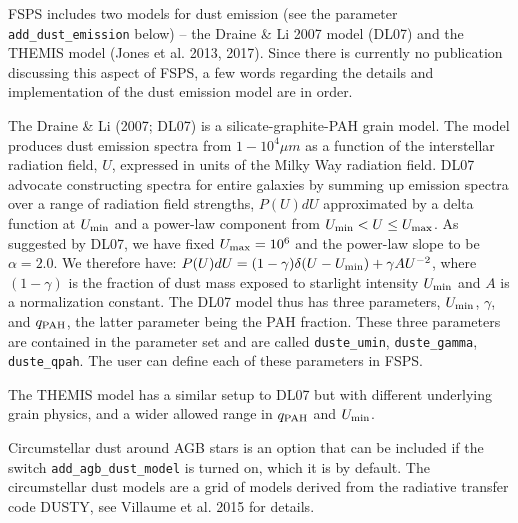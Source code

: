 \documentclass[]{article}
\begin{document}
\vspace{0.1in}
\vspace{0.1in}

\noindent
FSPS includes two models for dust emission (see the parameter
\texttt{add\_dust\_emission} below) -- the Draine \& Li 2007 model (DL07) and
the THEMIS model (Jones et al. 2013, 2017).  Since there is currently no
publication discussing this aspect of FSPS, a few words regarding the details
and implementation of the dust emission model are in order.

The Draine \& Li (2007; DL07) is a silicate-graphite-PAH grain model. The model
produces dust emission spectra from $1-10^4\mu m$ as a function of the
interstellar radiation field, $U$, expressed in units of the Milky Way radiation
field.  DL07 advocate constructing spectra for entire galaxies by summing up
emission spectra over a range of radiation field strengths, $P(U)dU$
approximated by a delta function at $U_{\rm min}$ and a power-law component from
$U_{\rm min}<U\leq U_{\rm max}$.  As suggested by DL07, we have fixed $U_{\rm
max}=10^6$ and the power-law slope to be $\alpha=2.0$.  We therefore have:
$P(U)dU=(1-\gamma)\delta(U-U_{\rm min})+\gamma A U^{-2}$,
where $(1-\gamma)$ is the fraction of dust mass exposed to starlight intensity
$U_{\rm min}$ and $A$ is a normalization constant.  The DL07 model thus has
three parameters, $U_{\rm min}$, $\gamma$, and $q_{\rm PAH}$, the latter
parameter being the PAH fraction.  These three parameters are contained in the
parameter set and are called \texttt{duste\_umin}, \texttt{duste\_gamma},
\texttt{duste\_qpah}. The user can define each of these parameters in FSPS.

The THEMIS model has a similar setup to DL07 but with different underlying grain
physics, and a wider allowed range in $q_{\rm PAH}$ and $U_{\rm min}$.

\vspace{0.1in}
\vspace{0.1in}

\noindent
Circumstellar dust around AGB stars is an option that can be included if the
switch \texttt{add\_agb\_dust\_model} is turned on, which it is by default.  The
circumstellar dust models are a grid of models derived from the radiative
transfer code DUSTY, see Villaume et al. 2015 for details.

\vspace{0.1in}
\vspace{0.1in}
\end{document}
